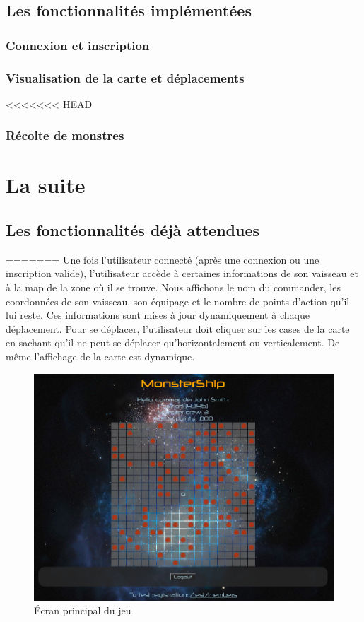 \documentclass[a4paper,11pt]{report}
\begin{document}
  \section{Les fonctionnalités implémentées}
    \subsection{Connexion et inscription}
    \subsection{Visualisation de la carte et déplacements}
<<<<<<< HEAD
    \subsection{Récolte de monstres}
\chapter{La suite}
  \section{Les fonctionnalités déjà attendues}
=======
      Une fois l'utilisateur connecté (après une connexion ou une inscription valide), l'utilisateur accède à certaines informations de son vaisseau et à la map de la zone où il se trouve.
      Nous affichons le nom du commander, les coordonnées de son vaisseau, son équipage et le nombre de points d'action qu'il lui reste. Ces informations sont mises à jour dynamiquement à chaque déplacement.
      Pour se déplacer, l'utilisateur doit cliquer sur les cases de la carte en sachant qu'il ne peut se déplacer qu'horizontalement ou verticalement. De même l'affichage de la carte est dynamique.
      \begin{figure}[H]
        \begin{center}
          \includegraphics[width=.8\textwidth]{images/home.png}
          \caption{Écran principal du jeu}
          \label{fig:ec_home}
        \end{center}
      \end{figure}
\end{document}
